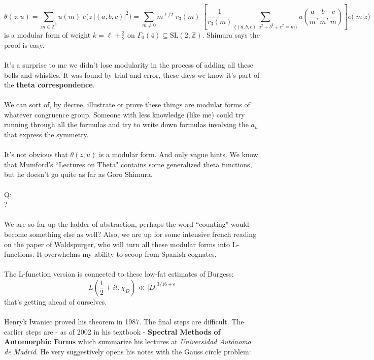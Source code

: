 \documentclass[12pt]{article}
\begin{document}
$$ \theta(z; u) = \sum_{m \in \mathbb{Z}^3} u(m) \; e \big(z \,|(a,b,c)|^2 \big)  =  \sum_{m \neq  0} m^{\ell/2} \; r_3(m) \; \left[ \frac{1}{r_3(m)} \sum_{ \{(a,b,c): a^2 + b^2 + c^2 = m  \}} u\left(\frac{a}{m},\frac{b}{m},\frac{c}{m} \right) \right] e \big( |m| z \big)  $$
is a modular form of weight $ k = \ell + \frac{3}{2}$ on $\Gamma_0(4) \subseteq \mathrm{SL}(2, \mathbb{Z})$. Shimura says the proof is easy. \\ \\
It's a surprise to me we didn't lose modularity in the process of adding all these bells and whistles.  It was found by trial-and-error, these days we know it's part of the \textbf{theta correspondence}.  \\ \\
We can sort of, by decree, illustrate or prove these things are modular forms of whatever congruence group.  Someone with less knowledge (like me) could try running through all the formulas and try to write down formulas involving the $a_n$ that express the symmetry. \\ \\
It's not obvious that $\theta(z; u)$ is a modular form.  And only vague hints.  We know that Mumford's ``Lectures on Theta" contains some generalized theta functions, but he doesn't go quite as far as Goro Shimura. \\ \\
Q: \\ 
{\color{orange!50!green}{Do coeffients of modular forms obtained by theta functions, count solutions to an equation}}? \\ \\
We are so far up the ladder of abstraction, perhaps the word ``counting" would become something else as well?  Also, we are up for some intensive french reading on the paper of Waldspurger, who will turn all these modular forms into L-functions. It overwhelms my ability to scoop from Spanish cognates. \\ \\
The L-function version is connected to these low-fat estimates of Burgess:
$$ L(\frac{1}{2} + it, \chi_D ) \ll |D|^{3/16 + \epsilon} $$
that's getting ahead of ourselves. \\ \\
Henryk Iwaniec proved his theorem in 1987.  The final steps are difficult.  The earlier steps are - as of 2002 in his textbook - \textbf{Spectral Methods of Automorphic Forms} which summarize his lectures at \textit{Universidad Aut\'{o}noma de Madrid}.  He very suggestively opens his notes with the Gauss circle problem:
\end{document}
